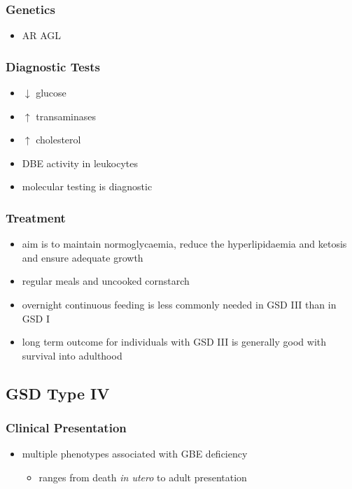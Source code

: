 \documentclass{scrartcl}
\begin{document}
\subsubsection{Genetics}
\label{sec:org5feefbb}
\begin{itemize}
\item AR AGL
\end{itemize}
\subsubsection{Diagnostic Tests}
\label{sec:org4accbe7}
\begin{itemize}
\item \(\downarrow\) glucose
\item \(\uparrow\) transaminases
\item \(\uparrow\) cholesterol
\item DBE activity in leukocytes
\item molecular testing is diagnostic
\end{itemize}
\subsubsection{Treatment}
\label{sec:org49e4b89}
\begin{itemize}
\item aim is to maintain normoglycaemia, reduce the hyperlipidaemia and ketosis and
ensure adequate growth
\item regular meals and uncooked cornstarch
\item overnight continuous feeding is less commonly needed in GSD III than
in GSD I
\item long term outcome for individuals with GSD III is generally good
with survival into adulthood
\end{itemize}
\subsection{GSD Type IV}
\label{sec:orgd4da6c2}
\subsubsection{Clinical Presentation}
\label{sec:orgcbe41d4}
\begin{itemize}
\item multiple phenotypes associated with GBE deficiency
\begin{itemize}
\item ranges from death \emph{in utero} to adult presentation
\end{itemize}
\end{itemize}
\end{document}
